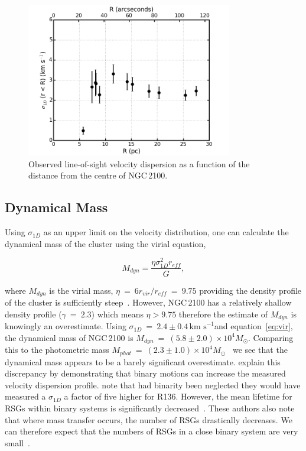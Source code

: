 \documentclass[useAMS,usenatbib]{mn2e}
\def\kms{$\mbox{km s}^{-1}$}
\begin{document}
\begin{figure}
 \includegraphics[width=9.0cm]{NGC2100-sig1d-v6}
 \caption{Observed line-of-sight velocity dispersion as a function of the distance from the centre of NGC\,2100.
\label{fig:sig1d}
          }
\end{figure}



\subsection{Dynamical Mass} %
\label{sub:dynamical_mass}


Using $\sigma_{1D}$ as an upper limit on the velocity distribution, one can calculate the dynamical mass of the cluster using the virial equation,

\begin{equation}
  M_{dyn} = \frac{\eta\sigma_{1D}^{2}r_{eff}}{G},
  \label{eq:vir}
\end{equation}

\noindent where $M_{dyn}$ is the virial mass, $\eta~=~6r_{vir}/r_{eff}~=~9.75$ providing the density profile of the cluster is sufficiently steep~\citep{2010ARA&A..48..431P}.
However, NGC\,2100 has a relatively shallow density profile ($\gamma~=~2.3$) which means $\eta>9.75$ therefore the estimate of $M_{dyn}$ is knowingly an overestimate.
Using $\sigma_{1D}~=~2.4\pm0.4$\,\kms and equation~\ref{eq:vir}, the dynamical mass of NGC\,2100 is $M_{dyn}~=~(5.8\pm2.0)\times 10^{4}M_{\odot}$.
Comparing this to the photometric mass $M_{phot}~=~(2.3\pm1.0)\times 10^{4}M_{\odot}$~\citep{2005ApJS..161..304M} we see that the dynamical mass appears to be a barely significant overestimate.
\citet{2010MNRAS.402.1750G} explain this discrepancy by demonstrating that binary motions can increase the measured velocity dispersion profile.
\citet{2012A&A...546A..73H} note that had binarity been neglected they would have measured a $\sigma_{1D}$ a factor of five higher for R136.
However, the mean lifetime for RSGs within binary systems is significantly decreased~\citep{2008MNRAS.384.1109E}.
These authors also note that where mass transfer occurs, the number of RSGs drastically decreases.
We can therefore expect that the numbers of RSGs in a close binary system are very small~\cite{2009ApJ...696.2014D}.
\end{document}
